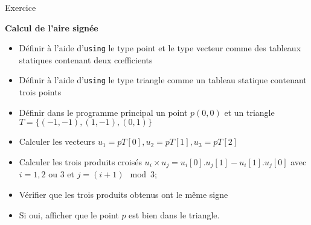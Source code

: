 \documentclass[compress,10pt,aspectratio=169]{beamer}
\begin{document}
\begin{frame}[fragile]{Exercice}
    \scriptsize 

    \textbf{Calcul de l'aire signée}

    \begin{itemize}
    \item Définir à l'aide d'\texttt{using} le type point et le type vecteur comme des tableaux statiques contenant deux c{\oe}fficients
    \item Définir à l'aide d'\texttt{using} le type triangle comme un tableau statique contenant trois points
    \item Définir dans le programme principal un point $p(0,0)$ et un triangle $T = \{ (-1,-1), (1,-1), (0,1) \}$
    \item Calculer les vecteurs $u_{1} = pT[0], u_{2} = pT[1], u_{3} = pT[2]$
    \item Calculer les trois produits croisés 
    $u_{i}\times u_{j} = u_{i}[0].u_{j}[1] - u_{i}[1].u_{j}[0]$ avec $i=1,2$ ou 3 et $j = (i+1)\mod 3$;
    \item Vérifier que les trois produits obtenus ont le même signe
    \item Si oui, afficher que le point $p$ est bien dans le triangle.
    \end{itemize}
\end{frame}
\end{document}
